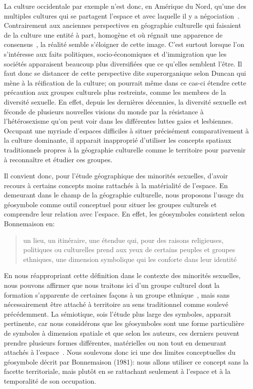La culture occidentale par exemple n'est donc, en Amérique du Nord, qu'une des multiples cultures qui se partagent l'espace et avec laquelle il y a négociation~\citep[11]{Duncan1993}. 
Contrairement aux anciennes perspectives en géographie culturelle qui faisaient de la culture une entité à part, homogène et où régnait une apparence de consensus~\citep{Duncan1980}, la réalité semble s'éloigner de cette image. 
C'est surtout lorsque l'on s'intéresse aux faits politiques, socio-économiques et d'immigration que les sociétés apparaisent beaucoup plus diversifiées que ce qu'elles semblent l'être. 
Il faut donc se distancer de cette perspective dite superorganique selon Duncan qui mène à la réification de la culture; on pourrait même dans ce cas-ci étendre cette précaution aux groupes culturels plus restreints, comme les membres de la diversité sexuelle. 
En effet, depuis les dernières décennies, la diversité sexuelle est féconde de plusieurs nouvelles visions du monde par la résistance à l'hétérosexisme qu'on peut voir dans les différentes luttes gaies et lesbiennes.
Occupant une myriade d'espaces difficiles à situer précisément comparativement à la culture dominante, il apparait inapproprié d'utiliser les concepts spatiaux traditionnels propres à la géographie culturelle comme le territoire pour parvenir à reconnaître et étudier ces groupes.

Il convient donc, pour l'étude géographique des minorités sexuelles, d'avoir recours à certains concepts moins rattachés à la matérialité de l'espace. 
En demeurant dans le champ de la géographie culturelle, nous proposons l'usage du géosymbole comme outil conceptuel pour situer les groupes culturels et comprendre leur relation avec l'espace. 
En effet, les géosymboles consistent selon Bonnemaison en: \blockquote[{\cite[256]{Bonnemaison1981}}][.]{\textelp{} un lieu, un   itinéraire, une étendue qui, pour des raisons religieuses, politiques ou   culturelles prend aux yeux de certains peuples et groupes ethniques, une   dimension symbolique qui les conforte dans leur identité }. 
En nous réappropriant cette définition dans le contexte des minorités sexuelles, nous pouvons affirmer que nous traitons ici d'un groupe culturel dont la formation s'apparente de certaines façons à un groupe ethnique~\citep{Sinfield1996}, mais sans nécessairement être attaché à territoire au sens traditionnel comme soulevé précédemment. 
La sémiotique, sois l'étude plus large des symboles, apparait pertinente, car nous considérons que les géosymboles sont une forme particulière de symboles à dimension spatiale et que selon les auteurs, ces derniers peuvent prendre plusieurs formes différentes, matérielles ou non tout en demeurant attachés à l'espace~\citep{Bonnemaison1981,Bedard2002}. 
Nous soulevons donc ici une des limites conceptuelles du géosymbole décrit par Bonnemaison (1981): nous allons utiliser ce concept sans la facette territoriale, mais plutôt en se rattachant seulement à l'espace et à la temporalité de son occupation.

